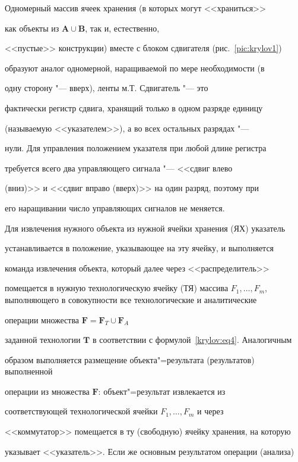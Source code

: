 Одномерный массив ячеек хранения (в которых могут <<храниться>>

как объекты из $\mathbf{A} \cup \mathbf{B}$, так и, естественно,

<<пустые>> конструкции) вместе с блоком сдвигателя (рис.~\ref{pic:krylov1})

образуют аналог одномерной, наращиваемой по мере необходимости (в

одну сторону "--- вверх), ленты м.Т. Сдвигатель "--- это

фактически регистр сдвига, хранящий только в одном разряде единицу

(называемую <<указателем>>), а во всех остальных разрядах "---

нули. Для управления положением указателя при любой длине регистра

требуется всего два управляющего сигнала "--- <<сдвиг влево

(вниз)>> и <<сдвиг вправо (вверх)>> на один разряд, поэтому при

его наращивании число управляющих сигналов не меняется.







Для извлечения нужного объекта из нужной ячейки хранения (ЯХ) указатель

устанавливается в положение, указывающее на эту ячейку, и выполняется

команда извлечения объекта, который далее через <<распределитель>>

помещается в нужную технологическую ячейку (ТЯ) массива $F_1,\ldots,

F_m$, выполняющего в совокупности все технологические и аналитические

операции множества $\mathbf{F} = \mathbf{F}_{T}\cup \mathbf{F}_{A}$

заданной технологии $\mathbf{T}$ в соответствии с формулой~\eqref{krylov:eq4}. Аналогичным

образом выполняется размещение объекта"=результата (результатов) выполненной

операции из множества $\mathbf{F}$: объект"=результат извлекается из

соответствующей технологической ячейки $F_1,\ldots, F_m$ и через

<<коммутатор>> помещается в ту (свободную) ячейку хранения, на которую

указывает <<указатель>>. Если же основным результатом операции (анализа)


